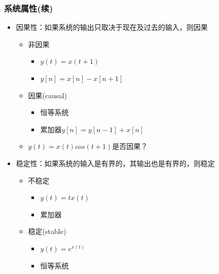 \documentclass[CJKutf8,dvipsnames,table]{beamer}
\begin{document}
\begin{CJK*}{UTF8}{song}
  \begin{frame}
    \frametitle{系统属性(续)}
    \begin{itemize}
    \item 因果性：如果系统的输出只取决于现在及过去的输入，则因果
        \begin{itemize}
        \item 非因果
            \begin{itemize}
            \item $y(t)=x(t+1)$
            \item $y[n]=x[n]-x[n+1]$
            \end{itemize}
        \item 因果(causal)    
            \begin{itemize}
            \item 恒等系统
	   \item 累加器$y[n]=y[n-1]+x[n]$
            \end{itemize}
        \item $y(t)=x(t)cos(t+1)$是否因果？
        \end{itemize}     
    \item 稳定性：如果系统的输入是有界的，其输出也是有界的，则稳定
        \begin{itemize}
        \item 不稳定
            \begin{itemize}
            \item $y(t)=tx(t)$
            \item 累加器
            \end{itemize}
        \item 稳定(stable)    
            \begin{itemize}
            \item $y(t)=e^{x(t)}$
	   \item 恒等系统
            \end{itemize}
        \end{itemize}     
    \end{itemize} 
  \end{frame}


\end{CJK*}
\end{document}
